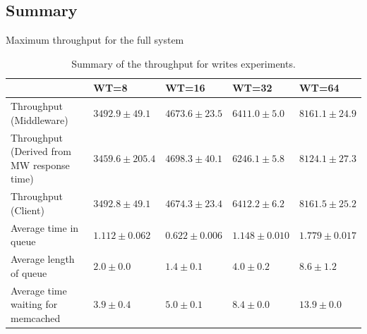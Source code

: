\documentclass[11pt,a4paper]{article}
\begin{document}
\subsection{Summary} \label{sec:tpfw-summary}
\begin{table}[h]
\small
\centering
{Maximum throughput for the full system}
\begin{tabular}{|p{5.1cm}|p{2.1cm}|p{1.9cm}|p{1.9cm}|p{1.9cm}|}
\hline                                            & WT=8               & WT=16             & WT=32             & WT=64             \\ 
\hline Throughput (Middleware)                    & $3492.9 \pm 49.1$  & $4673.6 \pm 23.5$ & $6411.0 \pm 5.0$  & $8161.1 \pm 24.9$  \\ 
\hline Throughput (Derived from MW response time) & $3459.6 \pm 205.4$ & $4698.3 \pm 40.1$ & $6246.1 \pm 5.8$  & $8124.1 \pm 27.3$ \\ 
\hline Throughput (Client)                        & $3492.8 \pm 49.1$  & $4674.3 \pm 23.4$ & $6412.2 \pm 6.2$  & $8161.5 \pm 25.2$ \\ 
\hline Average time in queue                      & $1.112 \pm 0.062$  & $0.622 \pm 0.006$ & $1.148 \pm 0.010$ & $1.779 \pm 0.017$ \\ 
\hline Average length of queue                    & $2.0 \pm 0.0$      & $1.4 \pm 0.1$     & $4.0 \pm 0.2$     & $8.6 \pm 1.2$     \\ 
\hline Average time waiting for memcached         & $3.9 \pm 0.4$      & $5.0 \pm 0.1$     & $8.4 \pm 0.0$     & $13.9 \pm 0.0$    \\ 
\hline 
\end{tabular}
\caption{Summary of the throughput for writes experiments.} \label{tab:tpfw-summary}
\end{table}
\end{document}
